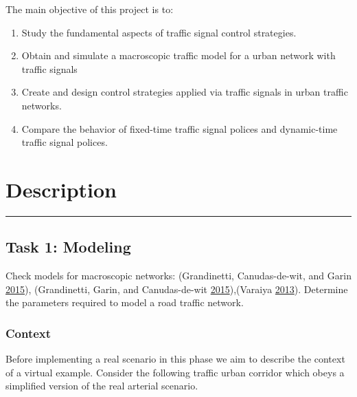 \documentclass[]{book}
\providecommand{\tightlist}{%
  \setlength{\itemsep}{0pt}\setlength{\parskip}{0pt}}
\theoremstyle{definition}
\theoremstyle{definition}
\theoremstyle{definition}
\theoremstyle{remark}
\begin{document}
The main objective of this project is to:

\begin{enumerate}
\def\labelenumi{\arabic{enumi}.}
\tightlist
\item
  Study the fundamental aspects of traffic signal control strategies.
\item
  Obtain and simulate a macroscopic traffic model for a urban network
  with traffic signals
\item
  Create and design control strategies applied via traffic signals in
  urban traffic networks.
\item
  Compare the behavior of fixed-time traffic signal polices and
  dynamic-time traffic signal polices.
\end{enumerate}

\hypertarget{description}{%
\section*{Description}\label{description}}

\begin{center}\rule{0.5\linewidth}{\linethickness}\end{center}

\hypertarget{task-1-modeling}{%
\subsection*{Task 1: Modeling}\label{task-1-modeling}}

Check models for macroscopic networks: (Grandinetti, Canudas-de-wit, and
Garin \protect\hyperlink{ref-Grandinetti2015}{2015}), (Grandinetti,
Garin, and Canudas-de-wit
\protect\hyperlink{ref-Grandinetti2016}{2015}),(Varaiya
\protect\hyperlink{ref-Varaiya2013:TR-C}{2013}). Determine the
parameters required to model a road traffic network.

\hypertarget{context-1}{%
\subsubsection*{Context}\label{context-1}}

Before implementing a real scenario in this phase we aim to describe the
context of a virtual example. Consider the following traffic urban
corridor which obeys a simplified version of the real arterial scenario.
\end{document}
